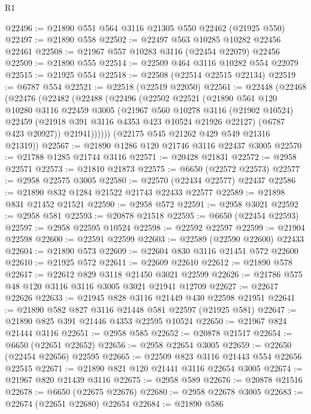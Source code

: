 \begin{lexlean}{R1}
\begin{coremodule}
@22496 := @21890 @551 @564 @3116 @21305 @550 @22462 (@21925 @550)
@22497 := @21890 @558
@22502 := @22497 @563 @10285 @10282 @22456 @22461
@22508 := @21967 @557 @10283 @3116 (@22454 @22079) @22456
@22509 := @21890 @555
@22514 := @22509 @464 @3116 @10282 @554 @22079
@22515 := @21925 @554
@22518 := @22508 (@22514 @22515 @22134)
@22519 := @6787 @554
@22521 := @22518 (@22519 @22050)
@22561 := @22448
    (@22468
      (@22476
        (@22482
          (@22488
            (@22496
              (@22502
                @22521
                (@21890
                  @561
                  @120
                  @10280
                  @3116
                  @22459
                  @3005
                  (@21967
                    @560
                    @10278
                    @3116
                    (@21902 @10524)
                    @22459
                    (@21918 @391 @3116 @4353 @423 @10524 @21926 @22127)
                    (@6787 @423 @20927))
                  @21941))))))
      (@22175 @545 @21262 @429 @549 @21316 @21319))
@22567 := @21890 @1286 @120 @21746 @3116 @22437 @3005
@22570 := @21788 @1285 @21744 @3116
@22571 := @20428 @21831
@22572 := @2958 @22571
@22573 := @21810 @21873
@22575 := @6650 (@22572 @22573)
@22577 := @2958 @22575 @3005
@22580 := @22570 (@22434 @22577) @22437
@22586 := @21890 @832 @1284 @21522 @21743 @22433 @22577
@22589 := @21898 @831 @21452 @21521
@22590 := @2958 @572
@22591 := @2958 @3021
@22592 := @2958 @581
@22593 := @20878 @21518
@22595 := @6650 (@22454 @22593)
@22597 := @2958 @22595 @10524
@22598 := @22592 @22597
@22599 := @21904 @22598
@22600 := @22591 @22599
@22603 := @22589 (@22590 @22600) @22433
@22604 := @21890 @573
@22609 := @22604 @830 @3116 @21451 @572 @22600
@22610 := @21925 @572
@22611 := @22609 @22610
@22612 := @21890 @578
@22617 := @22612 @829 @3118 @21450 @3021 @22599
@22626 := @21786 @575 @48 @120 @3116 @3116 @3005 @3021 @21941 @12709
@22627 := @22617 @22626
@22633 := @21945 @828 @3116 @21449 @430 @22598 @21951
@22641 := @21890 @582 @827 @3116 @21448 @581 @22597 (@21925 @581)
@22647 := @21890 @825 @391 @21446 @4353 @22595 @10524
@22650 := @21967 @824 @21444 @3116
@22651 := @2958 @585
@22652 := @20878 @21517
@22654 := @6650 (@22651 @22652)
@22656 := @2958 @22654 @3005
@22659 := @22650 (@22454 @22656) @22595
@22665 := @22509 @823 @3116 @21443 @554 @22656 @22515
@22671 := @21890 @821 @120 @21441 @3116 @22654 @3005
@22674 := @21967 @820 @21439 @3116
@22675 := @2958 @589
@22676 := @20878 @21516
@22678 := @6650 (@22675 @22676)
@22680 := @2958 @22678 @3005
@22683 := @22674 (@22651 @22680) @22654
@22684 := @21890 @586

\end{coremodule}
\end{lexlean}

